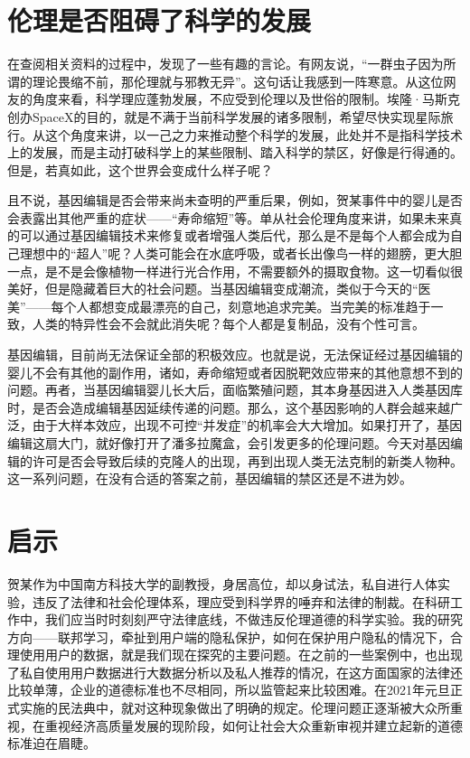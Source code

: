 \documentclass[UTF8,a4paper]{ctexart}
\begin{document}
\section{伦理是否阻碍了科学的发展}
在查阅相关资料的过程中，发现了一些有趣的言论。有网友说，“一群虫子因为所谓的理论畏缩不前，那伦理就与邪教无异”。这句话让我感到一阵寒意。从这位网友的角度来看，科学理应蓬勃发展，不应受到伦理以及世俗的限制。埃隆·马斯克创办SpaceX的目的，就是不满于当前科学发展的诸多限制，希望尽快实现星际旅行。从这个角度来讲，以一己之力来推动整个科学的发展，此处并不是指科学技术上的发展，而是主动打破科学上的某些限制、踏入科学的禁区，好像是行得通的。但是，若真如此，这个世界会变成什么样子呢？
\par
且不说，基因编辑是否会带来尚未查明的严重后果，例如，贺某事件中的婴儿是否会表露出其他严重的症状——“寿命缩短”等。单从社会伦理角度来讲，如果未来真的可以通过基因编辑技术来修复或者增强人类后代，那么是不是每个人都会成为自己理想中的“超人”呢？人类可能会在水底呼吸，或者长出像鸟一样的翅膀，更大胆一点，是不是会像植物一样进行光合作用，不需要额外的摄取食物。这一切看似很美好，但是隐藏着巨大的社会问题。当基因编辑变成潮流，类似于今天的“医美”——每个人都想变成最漂亮的自己，刻意地追求完美。当完美的标准趋于一致，人类的特异性会不会就此消失呢？每个人都是复制品，没有个性可言。
\par
基因编辑，目前尚无法保证全部的积极效应。也就是说，无法保证经过基因编辑的婴儿不会有其他的副作用，诸如，寿命缩短或者因脱靶效应带来的其他意想不到的问题。再者，当基因编辑婴儿长大后，面临繁殖问题，其本身基因进入人类基因库时，是否会造成编辑基因延续传递的问题。那么，这个基因影响的人群会越来越广泛，由于大样本效应，出现不可控“并发症”的机率会大大增加。如果打开了，基因编辑这扇大门，就好像打开了潘多拉魔盒，会引发更多的伦理问题。今天对基因编辑的许可是否会导致后续的克隆人的出现，再到出现人类无法克制的新类人物种。这一系列问题，在没有合适的答案之前，基因编辑的禁区还是不进为妙。


\section{启示}
贺某作为中国南方科技大学的副教授，身居高位，却以身试法，私自进行人体实验，违反了法律和社会伦理体系，理应受到科学界的唾弃和法律的制裁。在科研工作中，我们应当时时刻刻严守法律底线，不做违反伦理道德的科学实验。我的研究方向——联邦学习，牵扯到用户端的隐私保护，如何在保护用户隐私的情况下，合理使用用户的数据，就是我们现在探究的主要问题。在之前的一些案例中，也出现了私自使用用户数据进行大数据分析以及私人推荐的情况，在这方面国家的法律还比较单薄，企业的道德标准也不尽相同，所以监管起来比较困难。在2021年元旦正式实施的民法典中，就对这种现象做出了明确的规定。伦理问题正逐渐被大众所重视，在重视经济高质量发展的现阶段，如何让社会大众重新审视并建立起新的道德标准迫在眉睫。



\clearpage
\end{document}
